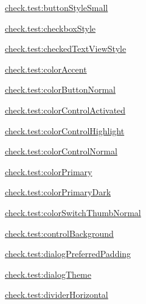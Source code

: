 {\ttfamily \hyperlink{classcheck_1_1test_1_1_r_1_1styleable_aaaa10bba1d9d98154b1920fc7823a5ed}{check.\+test\+:button\+Style\+Small}}

{\ttfamily \hyperlink{classcheck_1_1test_1_1_r_1_1styleable_a591338acd9ab74487b26ca7193e08bc4}{check.\+test\+:checkbox\+Style}}

{\ttfamily \hyperlink{classcheck_1_1test_1_1_r_1_1styleable_a3ea486b33baebd01084683194dba833d}{check.\+test\+:checked\+Text\+View\+Style}}

{\ttfamily \hyperlink{classcheck_1_1test_1_1_r_1_1styleable_a0066926f266b5ba28e4da64a5ee29bb9}{check.\+test\+:color\+Accent}}

{\ttfamily \hyperlink{classcheck_1_1test_1_1_r_1_1styleable_a3cf28f21d7d92dd03cab898e43cd3cf9}{check.\+test\+:color\+Button\+Normal}}

{\ttfamily \hyperlink{classcheck_1_1test_1_1_r_1_1styleable_a1d6c74771db390d0820612ca1d065c4d}{check.\+test\+:color\+Control\+Activated}}

{\ttfamily \hyperlink{classcheck_1_1test_1_1_r_1_1styleable_ac7b968aea5587a45f1935f379de1d8b7}{check.\+test\+:color\+Control\+Highlight}}

{\ttfamily \hyperlink{classcheck_1_1test_1_1_r_1_1styleable_a3fd140e79d5c291ac4ded3f747b333fd}{check.\+test\+:color\+Control\+Normal}}

{\ttfamily \hyperlink{classcheck_1_1test_1_1_r_1_1styleable_add0a3bacfd686c812b1d7045c47b17d5}{check.\+test\+:color\+Primary}}

{\ttfamily \hyperlink{classcheck_1_1test_1_1_r_1_1styleable_a06639297583ba9162a788c3513b9266c}{check.\+test\+:color\+Primary\+Dark}}

{\ttfamily \hyperlink{classcheck_1_1test_1_1_r_1_1styleable_a0380932431c2ed2292807679db341649}{check.\+test\+:color\+Switch\+Thumb\+Normal}}

{\ttfamily \hyperlink{classcheck_1_1test_1_1_r_1_1styleable_a8b78be6b3ea5c1a175341e08d853b1bd}{check.\+test\+:control\+Background}}

{\ttfamily \hyperlink{classcheck_1_1test_1_1_r_1_1styleable_a49869154ae939603270f1df062f8b8f5}{check.\+test\+:dialog\+Preferred\+Padding}}

{\ttfamily \hyperlink{classcheck_1_1test_1_1_r_1_1styleable_a25fd3dc52a7a1eab045aeadf0e4aa6c6}{check.\+test\+:dialog\+Theme}}

{\ttfamily \hyperlink{classcheck_1_1test_1_1_r_1_1styleable_acd0c530f019a2431d54c833109966ffb}{check.\+test\+:divider\+Horizontal}}

